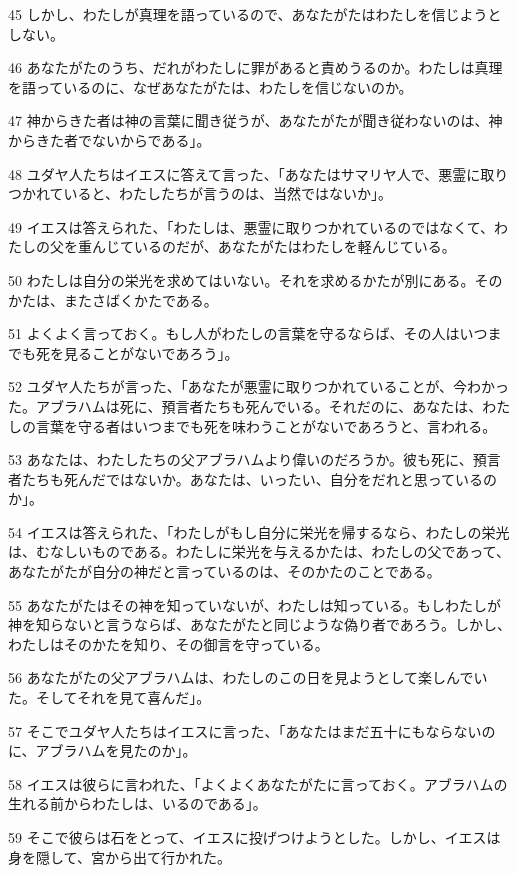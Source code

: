 \par 45 しかし、わたしが真理を語っているので、あなたがたはわたしを信じようとしない。
\par 46 あなたがたのうち、だれがわたしに罪があると責めうるのか。わたしは真理を語っているのに、なぜあなたがたは、わたしを信じないのか。
\par 47 神からきた者は神の言葉に聞き従うが、あなたがたが聞き従わないのは、神からきた者でないからである」。
\par 48 ユダヤ人たちはイエスに答えて言った、「あなたはサマリヤ人で、悪霊に取りつかれていると、わたしたちが言うのは、当然ではないか」。
\par 49 イエスは答えられた、「わたしは、悪霊に取りつかれているのではなくて、わたしの父を重んじているのだが、あなたがたはわたしを軽んじている。
\par 50 わたしは自分の栄光を求めてはいない。それを求めるかたが別にある。そのかたは、またさばくかたである。
\par 51 よくよく言っておく。もし人がわたしの言葉を守るならば、その人はいつまでも死を見ることがないであろう」。
\par 52 ユダヤ人たちが言った、「あなたが悪霊に取りつかれていることが、今わかった。アブラハムは死に、預言者たちも死んでいる。それだのに、あなたは、わたしの言葉を守る者はいつまでも死を味わうことがないであろうと、言われる。
\par 53 あなたは、わたしたちの父アブラハムより偉いのだろうか。彼も死に、預言者たちも死んだではないか。あなたは、いったい、自分をだれと思っているのか」。
\par 54 イエスは答えられた、「わたしがもし自分に栄光を帰するなら、わたしの栄光は、むなしいものである。わたしに栄光を与えるかたは、わたしの父であって、あなたがたが自分の神だと言っているのは、そのかたのことである。
\par 55 あなたがたはその神を知っていないが、わたしは知っている。もしわたしが神を知らないと言うならば、あなたがたと同じような偽り者であろう。しかし、わたしはそのかたを知り、その御言を守っている。
\par 56 あなたがたの父アブラハムは、わたしのこの日を見ようとして楽しんでいた。そしてそれを見て喜んだ」。
\par 57 そこでユダヤ人たちはイエスに言った、「あなたはまだ五十にもならないのに、アブラハムを見たのか」。
\par 58 イエスは彼らに言われた、「よくよくあなたがたに言っておく。アブラハムの生れる前からわたしは、いるのである」。
\par 59 そこで彼らは石をとって、イエスに投げつけようとした。しかし、イエスは身を隠して、宮から出て行かれた。

